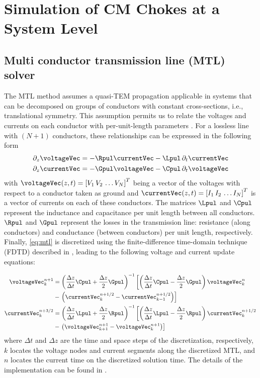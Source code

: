 \section{Simulation of CM Chokes at a System Level} \label{sec:simulation}

\subsection{Multi conductor transmission line (MTL) solver} \label{sec:mtl-solver}
The MTL method assumes a quasi-TEM propagation applicable in systems that can be decomposed on groups of conductors with constant cross-sections, i.e., translational symmetry.
This assumption permits us to relate the voltages and currents on each conductor with per-unit-length parameters \cite{Paul2007}.
For a lossless line with $(N+1)$ conductors, these relationships can be expressed in the following form
\begin{align}
	\partial_z \voltageVec &= -\Rpul \currentVec  - \Lpul \, \partial_t \currentVec \nonumber \\
	\partial_z \currentVec &= -\Gpul \voltageVec  - \Cpul \, \partial_t \voltageVec \label{eq:mtl}
\end{align} 
with $\voltageVec(z,t) = \left[ V_1 \, V_2 \, \hdots V_N \right]^T$ being a vector of the voltages with respect to a conductor taken as ground and $\currentVec (z,t) = \left[ I_1 \, I_2 \, \hdots I_N \right]^T$ is a vector of currents on each of these conductors. 
The matrices $\Lpul$ and $\Cpul$ represent the inductance and capacitance per unit length between all conductors.
$\Rpul$ and $\Gpul$ represent the losses in the transmission line: resistance (along conductors) and conductance (between conductors) per unit length, respectively.
Finally, \autoref{eq:mtl} is discretized using the finite-difference time-domain technique (FDTD) described in \cite{Paul2007}, leading to the following voltage and current update equations:

{\small
	\begin{align}
		\voltageVec^{n+1}_{k} &= \left(\frac{\Delta z}{\Delta t}\Cpul + \frac{\Delta z}{2}\Gpul \right)^{-1} \left[ \left(\frac{\Delta z}{\Delta t}\Cpul - \frac{\Delta z}{2}\Gpul \right) \voltageVec^{n}_{k} \right. \nonumber \\
		&- \left. \left(\currentVec^{n+1/2}_{k}-\currentVec^{n+1/2}_{k-1}\right) \right] \\
		\currentVec^{n+3/2}_{k} &= \left(\frac{\Delta z}{\Delta t}\Lpul + \frac{\Delta z}{2}\Rpul \right)^{-1} \left[ \left(\frac{\Delta z}{\Delta t}\Lpul - \frac{\Delta z}{2}\Rpul \right) \currentVec^{n+1/2}_{k} \right. \nonumber \\
		&- \left. \left(\voltageVec^{n+1}_{k+1}-\voltageVec^{n+1}_{k}\right) \right] \label{eq:fdtd-i-update}
	\end{align} 
}%
where $\Delta t$ and $\Delta z$ are the time and space steps of the discretization, respectively, $k$ locates the voltage nodes and current segments along the discretized MTL, and $n$ locates the current time on the discretized solution time. 
The details of the implementation can be found in \cite{opensemba-mtln}.

